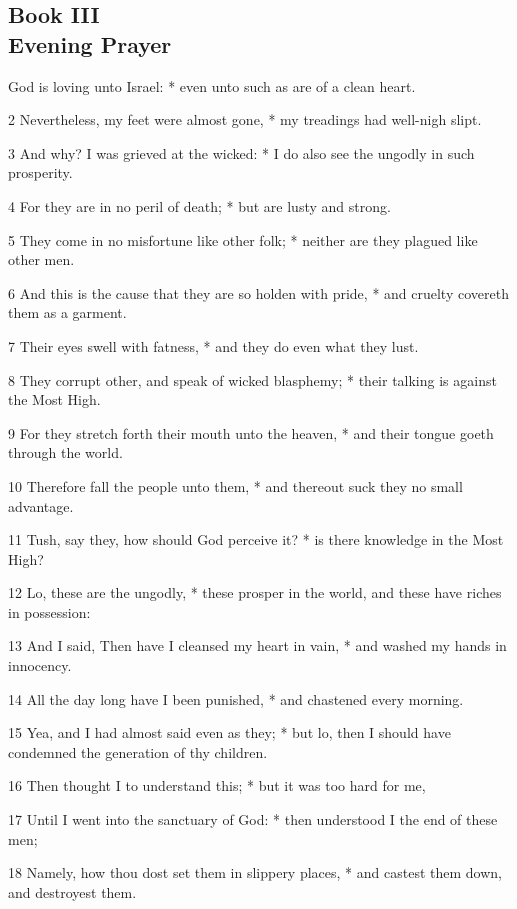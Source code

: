 \subsection{Book III\\Evening Prayer}
 God is loving unto Israel: * even unto such as are of a clean heart.\par
2 Nevertheless, my feet were almost gone, * my treadings had well-nigh slipt.\par
3 And why? I was grieved at the wicked: * I do also see the ungodly in such prosperity.\par
4 For they are in no peril of death; * but are lusty and strong.\par
5 They come in no misfortune like other folk; * neither are they plagued like other men.\par
6 And this is the cause that they are so holden with pride, * and cruelty covereth them as a garment.\par
7 Their eyes swell with fatness, * and they do even what they lust.\par
8 They corrupt other, and speak of wicked blasphemy; * their talking is against the Most High.\par
9 For they stretch forth their mouth unto the heaven, * and their tongue goeth through the world.\par
10 Therefore fall the people unto them, * and thereout suck they no small advantage.\par
11 Tush, say they, how should God perceive it? * is there knowledge in the Most High?\par
12 Lo, these are the ungodly, * these prosper in the world, and these have riches in possession:\par
13 And I said, Then have I cleansed my heart in vain, * and washed my hands in innocency.\par
14 All the day long have I been punished, * and chastened every morning.\par
15 Yea, and I had almost said even as they; * but lo, then I should have condemned the generation of thy children.\par
16 Then thought I to understand this; * but it was too hard for me,\par
17 Until I went into the sanctuary of God: * then understood I the end of these men;\par
18 Namely, how thou dost set them in slippery places, * and castest them down, and destroyest them.\par
